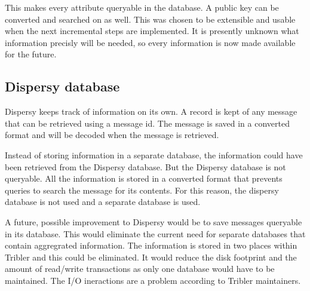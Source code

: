 This makes every attribute queryable in the database.
A public key can be converted and searched on as well.
This was chosen to be extensible and usable when the next incremental steps are implemented.
It is presently unknown what information precisly will be needed,
so every information is now made available for the future.

\subsection{Dispersy database}
Dispersy keeps track of information on its own.
A record is kept of any message that can be retrieved using a message id.
The message is saved in a converted format and will be decoded when the message is retrieved.

Instead of storing information in a separate database,
the information could have been retrieved from the Dispersy database.
But the Dispersy database is not queryable.
All the information is stored in a converted format
that prevents queries to search the message for its contents.
For this reason, the dispersy database is not used and a separate database is used.

A future, possible improvement to Dispersy would be to save messages queryable in its database.
This would eliminate the current need for separate databases that contain aggregrated information.
The information is stored in two places within Tribler and this could be eliminated.
It would reduce the disk footprint and the amount of read/write transactions
as only one database would have to be maintained.
The I/O ineractions are a problem according to Tribler maintainers.